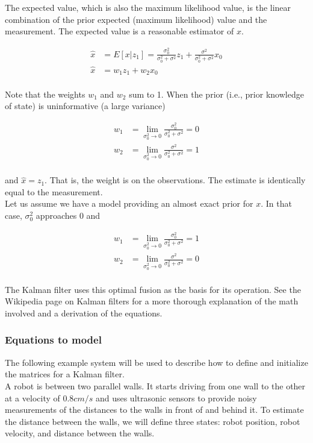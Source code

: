 \documentclass[10pt,conference,compsoc]{IEEEtran}
\begin{document}
The expected value, which is also the maximum likelihood value, is the linear
combination of the prior expected (maximum likelihood) value and the
measurement. The expected value is a reasonable estimator of $x$.

\begin{align}
  \hat{x} &= E[x|z_1] = \frac{\sigma_0^2}{\sigma_0^2 + \sigma^2}z_1 +
    \frac{\sigma^2}{\sigma_0^2 + \sigma^2}x_0 \\
  \hat{x} &= w_1 z_1 + w_2 x_0 \nonumber
\end{align}
\\
Note that the weights $w_1$ and $w_2$ sum to 1. When the prior (i.e., prior
knowledge of state) is uninformative (a large variance)

\begin{align}
  w_1 &= \lim_{\sigma_0^2 \to 0} \frac{\sigma_0^2}{\sigma_0^2 + \sigma^2} = 0 \\
  w_2 &= \lim_{\sigma_0^2 \to 0} \frac{\sigma^2}{\sigma_0^2 + \sigma^2} = 1
\end{align}
\\
and $\hat{x} = z_1$. That is, the weight is on the observations. The estimate is
identically equal to the measurement. \\

Let us assume we have a model providing an almost exact prior for $x$. In that
case, $\sigma_0^2$ approaches 0 and

\begin{align}
  w_1 &= \lim_{\sigma_0^2 \to 0} \frac{\sigma_0^2}{\sigma_0^2 + \sigma^2} = 1 \\
  w_2 &= \lim_{\sigma_0^2 \to 0} \frac{\sigma^2}{\sigma_0^2 + \sigma^2} = 0
\end{align}
\\
The Kalman filter uses this optimal fusion as the basis for its operation. See
the Wikipedia page on Kalman filters \cite{bib:kalman_filter} for a more
thorough explanation of the math involved and a derivation of the equations.

\subsubsection{Equations to model}

The following example system will be used to describe how to define and
initialize the matrices for a Kalman filter. \\

A robot is between two parallel walls. It starts driving from one wall to the
other at a velocity of $0.8 cm/s$ and uses ultrasonic sensors to provide noisy
measurements of the distances to the walls in front of and behind it. To
estimate the distance between the walls, we will define three states: robot
position, robot velocity, and distance between the walls.
\end{document}
